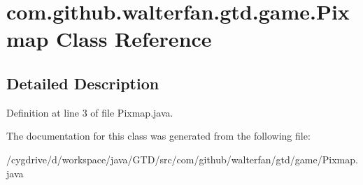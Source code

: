 \hypertarget{classcom_1_1github_1_1walterfan_1_1gtd_1_1game_1_1Pixmap}{\section{com.\-github.\-walterfan.\-gtd.\-game.\-Pixmap Class Reference}
\label{classcom_1_1github_1_1walterfan_1_1gtd_1_1game_1_1Pixmap}
}


\subsection{Detailed Description}


Definition at line 3 of file Pixmap.\-java.



The documentation for this class was generated from the following file\-:\begin{DoxyCompactItemize}
\item 
/cygdrive/d/workspace/java/\-G\-T\-D/src/com/github/walterfan/gtd/game/Pixmap.\-java\end{DoxyCompactItemize}
